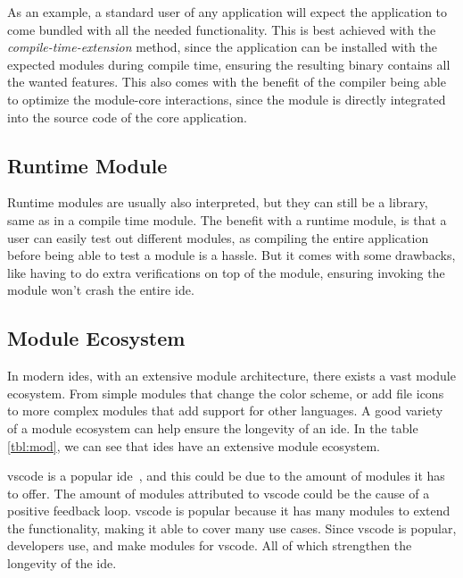 As an example, a standard user of any application will expect the application to
come bundled with all the needed functionality. This is best achieved with the
\textit{compile-time-extension} method, since the application can be installed
with the expected modules during compile time, ensuring the resulting binary
contains all the wanted features. This also comes with the benefit of the
compiler being able to optimize the module-core interactions, since the module
is directly integrated into the source code of the core application.

\subsection{Runtime Module}

Runtime modules are usually also interpreted, but they can still be a
library, same as in a compile time module. The benefit with a runtime module,
is that a user can easily test out different modules, as compiling the entire
application before being able to test a module is a hassle. But it comes with
some drawbacks, like having to do extra verifications on top of the module,
ensuring invoking the module won't crash the entire \gls*{ide}.

\subsection{Module Ecosystem}

In modern \gls*{ide}s, with an extensive module architecture, there exists a
vast module ecosystem. From simple modules that change the color scheme, or
add file icons to more complex modules that add support for other languages.
A good variety of a module ecosystem can help ensure the longevity of an
\gls*{ide}. In the table \ref{tbl:mod}, we can see that \gls*{ide}s have an
extensive module ecosystem. \footnotemark


\gls*{vscode} is a popular \gls*{ide}~\cite{topIde}, and this could be due to
the amount of modules it has to offer. The amount of modules attributed to
\gls*{vscode} could be the cause of a positive feedback loop. \gls*{vscode} is
popular because it has many modules to extend the functionality, making it able
to cover many use cases. Since \gls*{vscode} is popular, developers use, and make
modules for \gls*{vscode}. All of which strengthen the longevity of the
\gls*{ide}.

